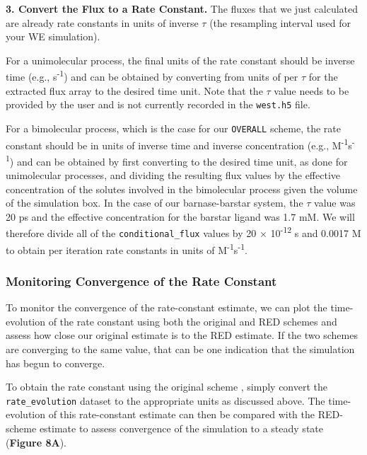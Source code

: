 \textbf{3. Convert the Flux to a Rate Constant.} The fluxes that we just calculated are already rate constants in units of inverse $\tau$ (the resampling interval used for your WE simulation). 

For a unimolecular process, the final units of the rate constant should be inverse time (e.g., s\textsuperscript{-1}) and can be obtained by converting from units of per $\tau$ for the extracted flux array to the desired time unit.
Note that the $\tau$ value needs to be provided by the user and is not currently recorded in the \verb|west.h5| file.

For a bimolecular process, which is the case for our \verb|OVERALL| scheme, the rate constant should be in units of inverse time and inverse concentration (e.g., M\textsuperscript{-1}s\textsuperscript{-1}) and can be obtained by first converting to the desired time unit, as done for unimolecular processes, and dividing the resulting flux values by the effective concentration of the solutes involved in the bimolecular process given the volume of the simulation box.
In the case of our barnase-barstar system, the $\tau$ value was 20 ps and the effective concentration for the barstar ligand was 1.7 mM.
We will therefore divide all of the \verb|conditional_flux| values by 20 $\times$ 10\textsuperscript{-12} s and 0.0017 M to obtain per iteration rate constants in units of M\textsuperscript{-1}s\textsuperscript{-1}.

\subsubsection{Monitoring Convergence of the Rate Constant}  

To monitor the convergence of the rate-constant estimate, we can plot the time-evolution of the rate constant using both the original and RED schemes and assess how close our original estimate is to the RED estimate.
If the two schemes are converging to the same value, that can be one indication that the simulation has begun to converge.

To obtain the rate constant using the original scheme \citep{huber_weighted-ensemble_1996}, simply convert the \verb|rate_evolution| dataset to the appropriate units as discussed above.
The time-evolution of this rate-constant estimate can then be compared with the RED-scheme estimate to assess convergence of the simulation to a steady state (\textbf{Figure 8A}).

